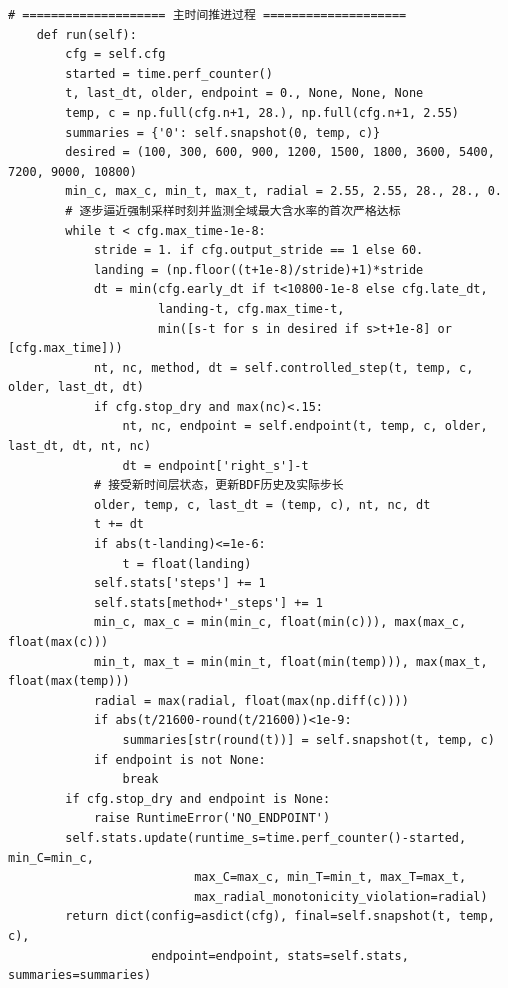 \begin{Verbatim}[fontsize=\scriptsize,breaklines=true,breakanywhere=true]
    # ==================== 主时间推进过程 ====================
    def run(self):
        cfg = self.cfg
        started = time.perf_counter()
        t, last_dt, older, endpoint = 0., None, None, None
        temp, c = np.full(cfg.n+1, 28.), np.full(cfg.n+1, 2.55)
        summaries = {'0': self.snapshot(0, temp, c)}
        desired = (100, 300, 600, 900, 1200, 1500, 1800, 3600, 5400, 7200, 9000, 10800)
        min_c, max_c, min_t, max_t, radial = 2.55, 2.55, 28., 28., 0.
        # 逐步逼近强制采样时刻并监测全域最大含水率的首次严格达标
        while t < cfg.max_time-1e-8:
            stride = 1. if cfg.output_stride == 1 else 60.
            landing = (np.floor((t+1e-8)/stride)+1)*stride
            dt = min(cfg.early_dt if t<10800-1e-8 else cfg.late_dt,
                     landing-t, cfg.max_time-t,
                     min([s-t for s in desired if s>t+1e-8] or [cfg.max_time]))
            nt, nc, method, dt = self.controlled_step(t, temp, c, older, last_dt, dt)
            if cfg.stop_dry and max(nc)<.15:
                nt, nc, endpoint = self.endpoint(t, temp, c, older, last_dt, dt, nt, nc)
                dt = endpoint['right_s']-t
            # 接受新时间层状态，更新BDF历史及实际步长
            older, temp, c, last_dt = (temp, c), nt, nc, dt
            t += dt
            if abs(t-landing)<=1e-6:
                t = float(landing)
            self.stats['steps'] += 1
            self.stats[method+'_steps'] += 1
            min_c, max_c = min(min_c, float(min(c))), max(max_c, float(max(c)))
            min_t, max_t = min(min_t, float(min(temp))), max(max_t, float(max(temp)))
            radial = max(radial, float(max(np.diff(c))))
            if abs(t/21600-round(t/21600))<1e-9:
                summaries[str(round(t))] = self.snapshot(t, temp, c)
            if endpoint is not None:
                break
        if cfg.stop_dry and endpoint is None:
            raise RuntimeError('NO_ENDPOINT')
        self.stats.update(runtime_s=time.perf_counter()-started, min_C=min_c,
                          max_C=max_c, min_T=min_t, max_T=max_t,
                          max_radial_monotonicity_violation=radial)
        return dict(config=asdict(cfg), final=self.snapshot(t, temp, c),
                    endpoint=endpoint, stats=self.stats, summaries=summaries)
\end{Verbatim}

